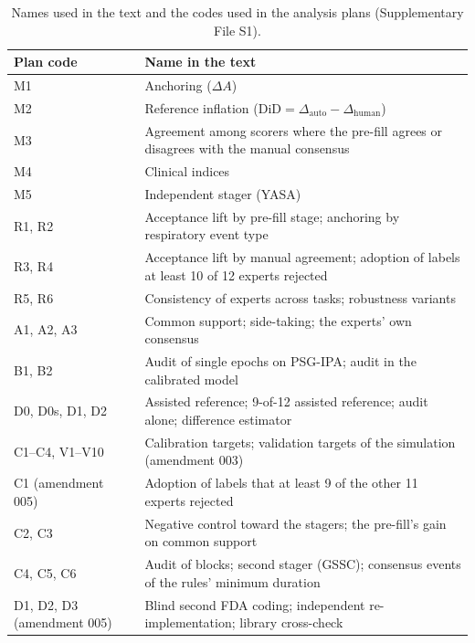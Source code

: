 \documentclass[11pt]{article}
\newcommand{\dA}{\Delta A}
\newcommand{\dauto}{\Delta_{\mathrm{auto}}}
\newcommand{\dhuman}{\Delta_{\mathrm{human}}}
\begin{document}
\begin{table}[h!]
\centering\footnotesize
\caption{Names used in the text and the codes used in the analysis plans (Supplementary File S1).}
\label{tab:s-codes}
\begin{tabular}{lp{10.6cm}}
\toprule
Plan code & Name in the text \\
\midrule
M1 & Anchoring ($\dA$) \\
M2 & Reference inflation ($\mathrm{DiD}=\dauto-\dhuman$) \\
M3 & Agreement among scorers where the pre-fill agrees or disagrees with the manual consensus \\
M4 & Clinical indices \\
M5 & Independent stager (YASA) \\
R1, R2 & Acceptance lift by pre-fill stage; anchoring by respiratory event type \\
R3, R4 & Acceptance lift by manual agreement; adoption of labels at least 10 of 12 experts rejected \\
R5, R6 & Consistency of experts across tasks; robustness variants \\
A1, A2, A3 & Common support; side-taking; the experts' own consensus \\
B1, B2 & Audit of single epochs on PSG-IPA; audit in the calibrated model \\
D0, D0s, D1, D2 & Assisted reference; 9-of-12 assisted reference; audit alone; difference estimator \\
C1--C4, V1--V10 & Calibration targets; validation targets of the simulation (amendment 003) \\
C1 (amendment 005) & Adoption of labels that at least 9 of the other 11 experts rejected \\
C2, C3 & Negative control toward the stagers; the pre-fill's gain on common support \\
C4, C5, C6 & Audit of blocks; second stager (GSSC); consensus events of the rules' minimum duration \\
D1, D2, D3 (amendment 005) & Blind second FDA coding; independent re-implementation; library cross-check \\
\bottomrule
\end{tabular}
\end{table}









\end{document}
